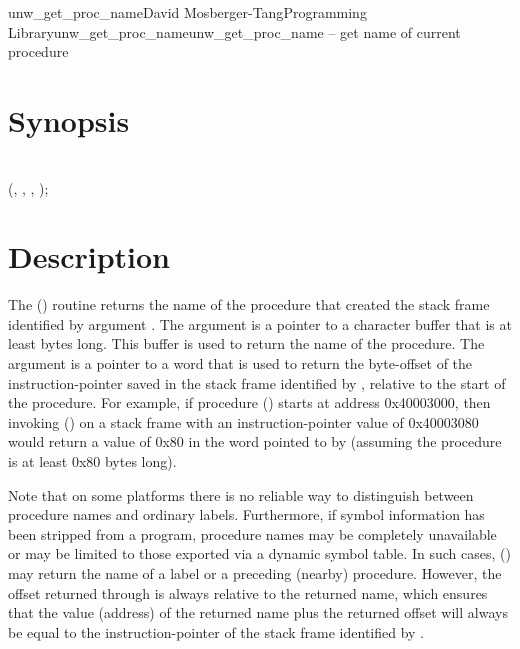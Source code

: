 \documentclass{article}
\begin{document}
\begin{Name}{3}{unw\_get\_proc\_name}{David Mosberger-Tang}{Programming Library}{unw\_get\_proc\_name}unw\_get\_proc\_name -- get name of current procedure
\end{Name}

\section{Synopsis}

\\

 (, ,  , );\\

\section{Description}

The () routine returns the name of the
procedure that created the stack frame identified by argument
.  The  argument is a pointer to a character buffer
that is at least  bytes long.  This buffer is used to return
the name of the procedure.  The  argument is a pointer to a
word that is used to return the byte-offset of the instruction-pointer
saved in the stack frame identified by , relative to the start
of the procedure.  For example, if procedure () starts at
address 0x40003000, then invoking () on a
stack frame with an instruction-pointer value of 0x40003080 would
return a value of 0x80 in the word pointed to by  (assuming
the procedure is at least 0x80 bytes long).

Note that on some platforms there is no reliable way to distinguish
between procedure names and ordinary labels.  Furthermore, if symbol
information has been stripped from a program, procedure names may be
completely unavailable or may be limited to those exported via a
dynamic symbol table.  In such cases, ()
may return the name of a label or a preceding (nearby) procedure.
However, the offset returned through  is always relative to
the returned name, which ensures that the value (address) of the
returned name plus the returned offset will always be equal to the
instruction-pointer of the stack frame identified by .
\end{document}
